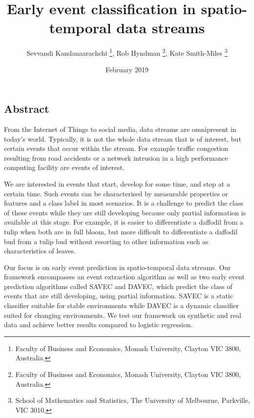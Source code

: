 \documentclass{article}
\begin{document}
\title{Early event classification in spatio-temporal data streams }
\author{Sevvandi Kandanaarachchi \thanks{Faculty of Business and Economics, Monash University, Clayton VIC 3800, Australia. }, Rob Hyndman \thanks{Faculty of Business and Economics, Monash University, Clayton VIC 3800, Australia. }, Kate Smith-Miles \thanks{School of Mathematics and Statistics, The University of Melbourne, Parkville, VIC 3010, } }
\date{February 2019}
\maketitle
\begin{centering}
\section*{Abstract}
\end{centering}


From the Internet of Things  to social media,  data streams are omnipresent in today's world. Typically, it is not the whole data stream that is of interest, but certain events that occur within the stream. For example traffic congestion resulting from road accidents or a network intrusion in a  high performance computing facility are events of interest.  

We are interested in events that start, develop for some time, and stop at a certain time. Such events can be characterised by measurable properties or features and a class label in most scenarios. It is a challenge to predict the class of these events while they are still developing because only partial information is available at this stage. For example, it is easier to differentiate a daffodil from a tulip when both are in full bloom, but more difficult to differentiate a daffodil bud from a tulip bud without resorting to other information such as characteristics of leaves. 

Our focus is on early event prediction in spatio-temporal data streams. Our framework encompasses an event extraction algorithm as well as two early event prediction algorithms called SAVEC and DAVEC, which predict the class of events that are still developing, using partial information. SAVEC is a static classifier suitable for stable environments while DAVEC is a dynamic classifier suited for changing environments. We test our framework on synthetic and real data and achieve better results compared to logistic regression.
 
\end{document}

